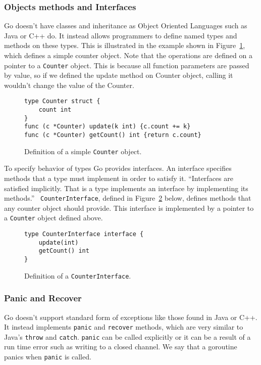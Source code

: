 \subsubsection{Objects methods and Interfaces}
Go doesn't have classes and inheritance as Object Oriented Languages 
such as Java or C++ do. It instead allows programmers to define named types
and methods on these types. This is illustrated in the example shown in 
Figure~\ref{fig:counterObj}, which defines a simple counter object.
Note that the operations are defined on a pointer to a \texttt{Counter}
object. This is because all function parameters are passed by value, so
if we defined the update method on Counter object, calling it wouldn't
change the value of the Counter.

\begin{figure}[h]
\centering
\begin{lstlisting}
type Counter struct {
    count int
}
func (c *Counter) update(k int) {c.count += k}
func (c *Counter) getCount() int {return c.count}
\end{lstlisting}
\caption[scale=1.0]{Definition of a simple \texttt{Counter} object.}
\label{fig:counterObj}
\end{figure}

To specify behavior of types Go provides interfaces. An interface
specifies methods that a type must implement in order to satisfy it.
``Interfaces are satisfied implicitly. That is a type implements 
an interface by implementing its methods.''~\cite{tour}
\texttt{CounterInterface}, defined in Figure~\ref{fig:counterInter} below,
defines methods that any counter object should provide. This interface 
is implemented by a pointer to a \texttt{Counter} object defined above.

\begin{figure}[h]
\centering
\begin{lstlisting}
type CounterInterface interface {
    update(int)
    getCount() int
}
\end{lstlisting}
\caption[scale=1.0]{Definition of a \texttt{CounterInterface}.}
\label{fig:counterInter}
\end{figure}

\subsubsection{Panic and Recover}
Go doesn't support standard form of exceptions like those found in Java or
C++. It instead implements \texttt{panic} and \texttt{recover} methods, 
which are very similar to Java's \texttt{throw} and \texttt{catch}.
\texttt{panic} can be called explicitly or it can be a result of 
a run time error such as writing to a closed channel. We say that 
a goroutine panics when \texttt{panic} is called.

